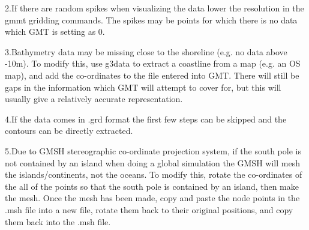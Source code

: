 2.If there are random spikes when visualizing the data lower the resolution in the gmmt gridding commands. The spikes
may be points for which there is no data which GMT is setting as 0.

3.Bathymetry data may be missing close to the shoreline (e.g. no data above -10m). To modify this, use g3data to extract a 
coastline from a map (e.g. an OS map), and add the co-ordinates to the file entered into GMT. There will still be gaps in the 
information which GMT will attempt to cover for, but  this will usually give a relatively accurate representation.

4.If the data comes in .grd format the first few steps can be skipped and the contours can be directly extracted.

5.Due to GMSH stereographic co-ordinate projection system, if the south pole is not contained by an island when doing a global 
simulation the GMSH will mesh the islands/continents, not the oceans. To modify this, rotate the co-ordinates of the all of the 
points so that the south pole is contained by an island, then make the mesh. Once the mesh has been made, copy and paste the node 
points in the .msh file into a new file, rotate them back to their original positions, and copy them back into the .msh file.


